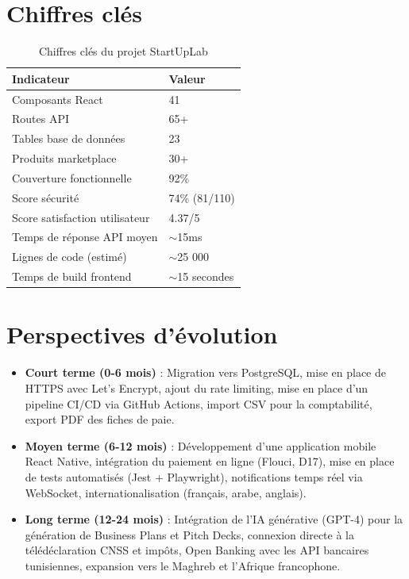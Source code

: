 \section*{Chiffres clés}

\begin{table}[H]
\centering
\begin{tabular}{|l|l|}
\hline
\textbf{Indicateur} & \textbf{Valeur} \\
\hline
Composants React & 41 \\
\hline
Routes API & 65+ \\
\hline
Tables base de données & 23 \\
\hline
Produits marketplace & 30+ \\
\hline
Couverture fonctionnelle & 92\% \\
\hline
Score sécurité & 74\% (81/110) \\
\hline
Score satisfaction utilisateur & 4.37/5 \\
\hline
Temps de réponse API moyen & $\sim$15ms \\
\hline
Lignes de code (estimé) & $\sim$25 000 \\
\hline
Temps de build frontend & $\sim$15 secondes \\
\hline
\end{tabular}
\caption{Chiffres clés du projet StartUpLab}
\end{table}

\section*{Perspectives d'évolution}

\begin{itemize}
    \item \textbf{Court terme (0-6 mois)} : Migration vers PostgreSQL, mise en place de HTTPS avec Let's Encrypt, ajout du rate limiting, mise en place d'un pipeline CI/CD via GitHub Actions, import CSV pour la comptabilité, export PDF des fiches de paie.

    \item \textbf{Moyen terme (6-12 mois)} : Développement d'une application mobile React Native, intégration du paiement en ligne (Flouci, D17), mise en place de tests automatisés (Jest + Playwright), notifications temps réel via WebSocket, internationalisation (français, arabe, anglais).

    \item \textbf{Long terme (12-24 mois)} : Intégration de l'IA générative (GPT-4) pour la génération de Business Plans et Pitch Decks, connexion directe à la télédéclaration CNSS et impôts, Open Banking avec les API bancaires tunisiennes, expansion vers le Maghreb et l'Afrique francophone.
\end{itemize}

